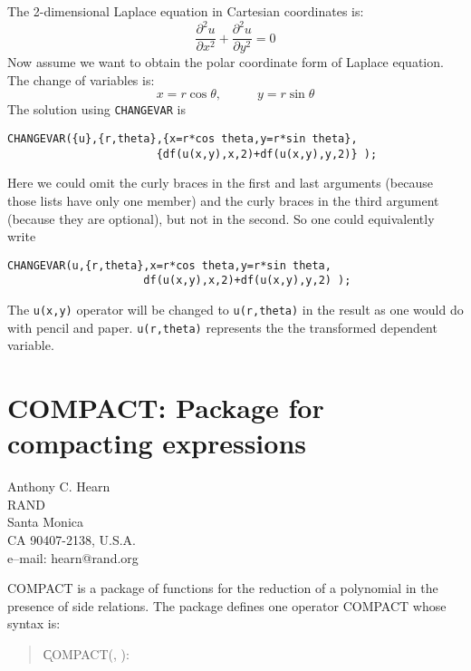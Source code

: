 \documentclass[11pt,letterpaper]{book}
\makeatletter
\newcommand{\underscore}{\_}
\newcommand{\ttindex}[1]{{\renewcommand{\_}{\protect\underscore}%
                          \index{#1@{\tt #1}}}}
\makeatother
\begin{document}
The 2-dimensional Laplace equation in Cartesian coordinates is:
\[
   \frac{\partial^{2} u}{\partial x^{2}} +
   \frac{\partial^{2} u}{\partial y^{2}} = 0
\]
Now assume we want to obtain the polar coordinate form of Laplace equation.
The change of variables is:
\[
   x = r \cos \theta, {\;\;\;\;\;\;\;\;\;\;}  y = r \sin \theta
\]
The solution using {\tt CHANGEVAR} is
{\small\begin{verbatim}
CHANGEVAR({u},{r,theta},{x=r*cos theta,y=r*sin theta},
                       {df(u(x,y),x,2)+df(u(x,y),y,2)} );
\end{verbatim}}

Here we could omit the curly braces in the first and last arguments (because
those lists have only one member) and the curly braces in the third argument
(because they are optional), but not in the second.  So one could
equivalently write
{\small\begin{verbatim}
CHANGEVAR(u,{r,theta},x=r*cos theta,y=r*sin theta,
                     df(u(x,y),x,2)+df(u(x,y),y,2) );
\end{verbatim}}

The {\tt u(x,y)} operator will be changed to {\tt u(r,theta)} in the
result as one would do with pencil and paper. {\tt u(r,theta)}
represents the  the transformed dependent variable.

\chapter[COMPACT: Compacting expressions]{COMPACT: Package for compacting expressions}
\label{COMPACT}

{\footnotesize
\begin{center}
Anthony C. Hearn\\
RAND\\
Santa Monica \\
CA 90407-2138, U.S.A. \\[0.05in]
e--mail: hearn@rand.org
\end{center}
}

\ttindex{COMPACT}
{COMPACT} is a package of functions for the reduction of a polynomial in
the presence of side relations.  The package defines one operator {COMPACT}
whose syntax is:

\begin{quote}
\k{COMPACT}(, ):
\end{quote}
\end{document}
